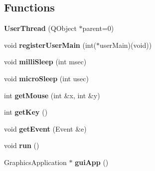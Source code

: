 \subsection*{Functions}
\begin{DoxyCompactItemize}
\item 
\hypertarget{group___graphics_internal_ga520a11a377381bb516be45e6d5564a51}{{\bfseries User\-Thread} (Q\-Object $\ast$parent=0)}\label{group___graphics_internal_ga520a11a377381bb516be45e6d5564a51}

\item 
\hypertarget{group___graphics_internal_ga205cb5d1ecd1b0a8473ec0233724b8d9}{void {\bfseries register\-User\-Main} (int($\ast$user\-Main)(void))}\label{group___graphics_internal_ga205cb5d1ecd1b0a8473ec0233724b8d9}

\item 
\hypertarget{group___graphics_internal_gaacb94ff196c97609974b21595461e093}{void {\bfseries milli\-Sleep} (int msec)}\label{group___graphics_internal_gaacb94ff196c97609974b21595461e093}

\item 
\hypertarget{group___graphics_internal_ga64b410b838a1bda3e1a16f1b4171eb99}{void {\bfseries micro\-Sleep} (int usec)}\label{group___graphics_internal_ga64b410b838a1bda3e1a16f1b4171eb99}

\item 
\hypertarget{group___graphics_internal_ga4ac6dfc380bd4b753f2433a081a51942}{int {\bfseries get\-Mouse} (int \&x, int \&y)}\label{group___graphics_internal_ga4ac6dfc380bd4b753f2433a081a51942}

\item 
\hypertarget{group___graphics_internal_gaa5cbe387ac3ae002933daa7d8371d17b}{int {\bfseries get\-Key} ()}\label{group___graphics_internal_gaa5cbe387ac3ae002933daa7d8371d17b}

\item 
\hypertarget{group___graphics_internal_ga66b52a9903f2651cd0968a9282d9d740}{void {\bfseries get\-Event} (Event \&e)}\label{group___graphics_internal_ga66b52a9903f2651cd0968a9282d9d740}

\item 
\hypertarget{group___graphics_internal_ga13a43e6d814de94978c515cb084873b1}{void {\bfseries run} ()}\label{group___graphics_internal_ga13a43e6d814de94978c515cb084873b1}

\item 
\hypertarget{group___graphics_internal_ga337b7855de20a6d29b8f511a12fe5203}{Graphics\-Application $\ast$ {\bfseries gui\-App} ()}\label{group___graphics_internal_ga337b7855de20a6d29b8f511a12fe5203}


\end{DoxyCompactItemize}
